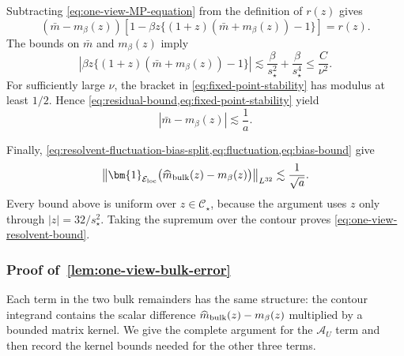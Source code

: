 \documentclass[11pt]{article}
\newcommand{\ind}{\bm{1}}
\newcommand{\cE}{\mathcal{E}}
\begin{document}
Subtracting \cref{eq:one-view-MP-equation} from the definition of $r(z)$
gives
\begin{equation}
\label{eq:fixed-point-stability}
  (\bar m-m_\beta(z))
  \left[
    1
    -
    \beta z
    \bigl\{
      (1+z)(\bar m+m_\beta(z))-1
    \bigr\}
  \right]
  =
  r(z).
\end{equation}
The bounds on $\bar m$ and $m_\beta(z)$ imply
\[
  \left|
    \beta z
    \bigl\{
      (1+z)(\bar m+m_\beta(z))-1
    \bigr\}
  \right|
  \lesssim
  \frac{\beta}{s_\star^2}
  +
  \frac{\beta}{s_\star^4}
  \le
  \frac{C}{\nu^2}.
\]
For sufficiently large $\nu$, the bracket in
\cref{eq:fixed-point-stability} has modulus at least $1/2$. Hence
\cref{eq:residual-bound,eq:fixed-point-stability} yield
\begin{equation}
\label{eq:bias-bound}
  |\bar m-m_\beta(z)|
  \lesssim
  \frac1a.
\end{equation}

Finally, \cref{eq:resolvent-fluctuation-bias-split,eq:fluctuation,eq:bias-bound}
give
\[
  \left\|
    \ind_{\cE_{\rm loc}}
    \bigl(
      \widehat m_{\rm bulk}(z)-m_\beta(z)
    \bigr)
  \right\|_{L^{32}}
  \lesssim
  \frac1{\sqrt a}.
\]
Every bound above is uniform over $z\in\mathcal C_\star$, because the
argument uses $z$ only through $|z|=32/s_\star^2$. Taking the supremum over
the contour proves \cref{eq:one-view-resolvent-bound}.


\subsubsection{Proof of~\cref{lem:one-view-bulk-error}}

Each term in the two bulk remainders has the same structure: the contour
integrand contains the scalar difference
$\widehat m_{\rm bulk}(z)-m_\beta(z)$ multiplied by a bounded matrix kernel.  We
give the complete argument for the $\mathcal A_U$ term and then record the
kernel bounds needed for the other three terms.
\end{document}
